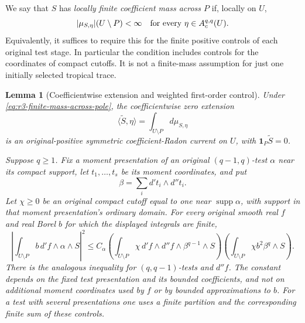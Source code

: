 \documentclass[11pt,a4paper]{article}
\numberwithin{equation}{section}
\newtheorem{lemma}[theorem]{Lemma}
\theoremstyle{definition}
\theoremstyle{remark}
\begin{document}
We say that $S$ has \emph{locally finite coefficient mass across
$P$} if, locally on $U$,
\begin{equation}
 \label{eq:r3-finite-mass-across-pole}
 |\mu_{S,\eta}|(U\setminus P)<\infty
 \quad\hbox{for every }\eta\in A_c^{q,q}(U).
\end{equation}
Equivalently, it suffices to require this for the finite positive
controls of each original test stage. In particular the condition
includes controls for the coordinates of compact cutoffs. It is
not a finite-mass assumption for just one initially selected
tropical trace.

\begin{lemma}[Coefficientwise extension and weighted first-order control]
\label{lem:r3-zero-extension-controls}
Under \eqref{eq:r3-finite-mass-across-pole}, the coefficientwise
zero extension
\[
 \langle\widetilde S,\eta\rangle
       =\int_{U\setminus P}d\mu_{S,\eta}
\]
is an original-positive symmetric coefficient-Radon current on $U$,
with $\mathbf1_P\widetilde S=0$.

Suppose $q\geq1$. Fix a moment presentation of an original
$(q-1,q)$-test $\alpha$ near its compact support, let $t_1,\ldots,t_s$
be its moment coordinates, and put
\[
 \beta=\sum_i d't_i\wedge d''t_i.
\]
Let $\chi\geq0$ be an original compact cutoff equal to one near
$\operatorname{supp}\alpha$, with support in that moment
presentation's ordinary domain. For every original smooth real $f$
and real Borel $b$ for which the displayed integrals are finite,
\begin{equation}
 \label{eq:r3-weighted-first-order-control}
 \left|\int_{U\setminus P}b\,d'f\wedge\alpha\wedge S\right|^2
 \leq C_\alpha
 \left(\int_{U\setminus P}\chi\,d'f\wedge d''f
                           \wedge\beta^{q-1}\wedge S\right)
 \left(\int_{U\setminus P}\chi b^2\beta^q\wedge S\right).
\end{equation}
There is the analogous inequality for $(q,q-1)$-tests and $d''f$.
The constant depends on the fixed test presentation and its bounded
coefficients, and not on additional moment coordinates used by $f$
or by bounded approximations to $b$. For a test with several
presentations one uses a finite partition and the corresponding
finite sum of these controls.
\end{lemma}
\end{document}
